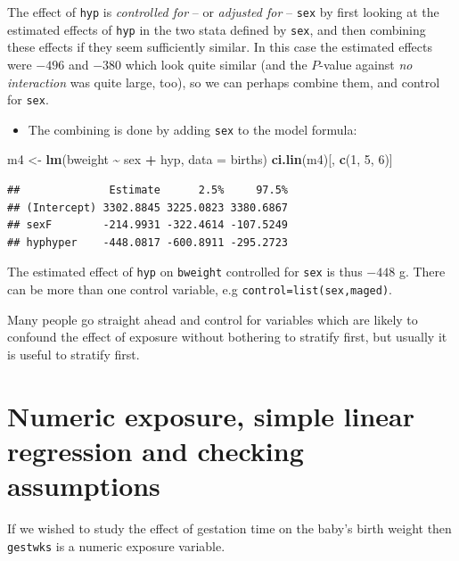 \documentclass[
]{book}
\newenvironment{Shaded}{\begin{snugshade}}{\end{snugshade}}
\newcommand{\AttributeTok}[1]{\textcolor[rgb]{0.13,0.29,0.53}{#1}}
\newcommand{\DecValTok}[1]{\textcolor[rgb]{0.00,0.00,0.81}{#1}}
\newcommand{\FunctionTok}[1]{\textcolor[rgb]{0.13,0.29,0.53}{\textbf{#1}}}
\newcommand{\NormalTok}[1]{#1}
\newcommand{\OtherTok}[1]{\textcolor[rgb]{0.56,0.35,0.01}{#1}}
\newcommand{\SpecialCharTok}[1]{\textcolor[rgb]{0.81,0.36,0.00}{\textbf{#1}}}
\providecommand{\tightlist}{%
  \setlength{\itemsep}{0pt}\setlength{\parskip}{0pt}}
\begin{document}
The effect of \texttt{hyp} is \emph{controlled for} -- or \emph{adjusted for} -- \texttt{sex}
by first looking at the estimated effects of \texttt{hyp} in the two stata defined
by \texttt{sex}, and then combining these effects if they seem sufficiently similar.
In this case the estimated effects were \(-496\) and \(-380\) which look quite
similar (and the \(P\)-value against \emph{no interaction} was quite large, too),
so we can perhaps combine them, and control for \texttt{sex}.

\begin{itemize}
\tightlist
\item
  The combining is done by adding \texttt{sex} to the model formula:
\end{itemize}

\begin{Shaded}
\begin{Highlighting}[]
\NormalTok{m4 }\OtherTok{\textless{}{-}} \FunctionTok{lm}\NormalTok{(bweight }\SpecialCharTok{\textasciitilde{}}\NormalTok{ sex }\SpecialCharTok{+}\NormalTok{ hyp, }\AttributeTok{data =}\NormalTok{ births)}
\FunctionTok{ci.lin}\NormalTok{(m4)[, }\FunctionTok{c}\NormalTok{(}\DecValTok{1}\NormalTok{, }\DecValTok{5}\NormalTok{, }\DecValTok{6}\NormalTok{)]}
\end{Highlighting}
\end{Shaded}

\begin{verbatim}
##              Estimate      2.5%     97.5%
## (Intercept) 3302.8845 3225.0823 3380.6867
## sexF        -214.9931 -322.4614 -107.5249
## hyphyper    -448.0817 -600.8911 -295.2723
\end{verbatim}

The estimated effect of \texttt{hyp} on \texttt{bweight}
controlled for \texttt{sex} is thus \(-448\) g.
There can be more than one control variable, e.g
\texttt{control=list(sex,maged)}.

Many people go straight ahead and control for variables which are likely to confound the effect of exposure without bothering to stratify first, but usually it is useful to stratify first.

\section{Numeric exposure, simple linear regression and checking assumptions}\label{numeric-exposure-simple-linear-regression-and-checking-assumptions}

If we wished to study the effect of gestation time on the baby's birth
weight then \texttt{gestwks} is a numeric exposure variable.
\end{document}
